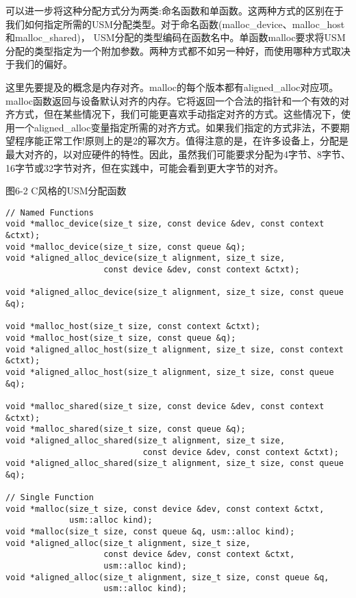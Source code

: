 可以进一步将这种分配方式分为两类:命名函数和单函数。这两种方式的区别在于我们如何指定所需的USM分配类型。对于命名函数(malloc\_device、malloc\_host和malloc\_shared)， USM分配的类型编码在函数名中。单函数malloc要求将USM分配的类型指定为一个附加参数。两种方式都不如另一种好，而使用哪种方式取决于我们的偏好。\par

这里先要提及的概念是内存对齐。malloc的每个版本都有aligned\_alloc对应项。malloc函数返回与设备默认对齐的内存。它将返回一个合法的指针和一个有效的对齐方式，但在某些情况下，我们可能更喜欢手动指定对齐的方式。这些情况下，使用一个aligned\_alloc变量指定所需的对齐方式。如果我们指定的方式非法，不要期望程序能正常工作!原则上的是2的幂次方。值得注意的是，在许多设备上，分配是最大对齐的，以对应硬件的特性。因此，虽然我们可能要求分配为4字节、8字节、16字节或32字节对齐，但在实践中，可能会看到更大字节的对齐。\par

\hspace*{\fill} \par %
图6-2 C风格的USM分配函数
\begin{lstlisting}[caption={}]
// Named Functions
void *malloc_device(size_t size, const device &dev, const context &ctxt);
void *malloc_device(size_t size, const queue &q);
void *aligned_alloc_device(size_t alignment, size_t size,
					const device &dev, const context &ctxt);

void *aligned_alloc_device(size_t alignment, size_t size, const queue &q);

void *malloc_host(size_t size, const context &ctxt);
void *malloc_host(size_t size, const queue &q);
void *aligned_alloc_host(size_t alignment, size_t size, const context
&ctxt);
void *aligned_alloc_host(size_t alignment, size_t size, const queue &q);

void *malloc_shared(size_t size, const device &dev, const context &ctxt);
void *malloc_shared(size_t size, const queue &q);
void *aligned_alloc_shared(size_t alignment, size_t size,
							const device &dev, const context &ctxt);
void *aligned_alloc_shared(size_t alignment, size_t size, const queue &q);

// Single Function
void *malloc(size_t size, const device &dev, const context &ctxt,
			 usm::alloc kind);
void *malloc(size_t size, const queue &q, usm::alloc kind);
void *aligned_alloc(size_t alignment, size_t size,
					const device &dev, const context &ctxt,
					usm::alloc kind);
void *aligned_alloc(size_t alignment, size_t size, const queue &q,
					usm::alloc kind);
\end{lstlisting}

